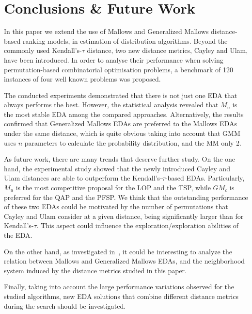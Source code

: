 \documentclass[conference]{IEEEtran}
\begin{document}
\section{Conclusions \& Future Work}\label{sec:conclusions}
In this paper we extend the use of Mallows and Generalized Mallows distance-based ranking models, in estimation of distribution algorithms. Beyond the commonly used Kendall's-$\tau$ distance, two new distance metrics, Cayley and Ulam, have been introduced. In order to analyse their performance when solving permutation-based combinatorial optimisation problems, a benchmark of 120 instances of four well known problems was proposed. 

The conducted experiments demonstrated that there is not just one EDA that always performs the best. However, the statistical analysis revealed that $M_u$ is the most stable EDA among the compared approaches. Alternatively, the results confirmed that Generalized Mallows EDAs are preferred to the Mallows EDAs under the same distance, which is quite obvious taking into account that GMM uses $n$ parameters to calculate the probability distribution, and the MM only 2.

As future work, there are many trends that deserve further study. On the one hand, the experimental study showed that the newly introduced Cayley and Ulam distances are able to outperform the Kendall's-$\tau$-based EDAs. Particularly, $M_u$ is the most competitive proposal for the LOP and the TSP, while $GM_c$ is preferred for the QAP and the PFSP. We think that the outstanding performance of these two EDAs could be motivated by the number of permutations that Cayley and Ulam consider at a given distance, being significantly larger than for Kendall's-$\tau$. This aspect could influence the exploration/exploration abilities of the EDA.

On the other hand, as investigated in~\cite{Echegoyen2013}, it could be interesting to analyze the relation between Mallows and Generalized Mallows EDAs, and the neighborhood system induced by the distance metrics studied in this paper.

Finally, taking into account the large performance variations observed for the studied algorithms, new EDA solutions that combine different distance metrics during the search should be investigated. %

\end{document}
